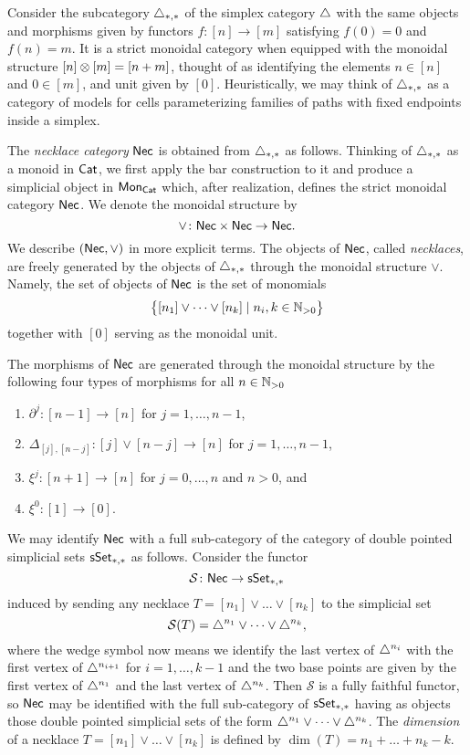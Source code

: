 Consider the subcategory $\triangle_{*,*}$ of the simplex category $\triangle$ with the same objects and morphisms given by functors $f \colon [n] \to [m]$ satisfying $f(0) = 0$ and $f(n) = m$.
It is a strict monoidal category when equipped with the monoidal structure $[n] \otimes [m] = [n+m]$, thought of as identifying the elements $n \in [n]$ and $0 \in [m]$, and unit given by $[0]$.
Heuristically, we may think of $\triangle_{*,*}$ as a category of models for cells parameterizing families of paths with fixed endpoints inside a simplex.


The \textit{necklace category} $\mathsf{Nec}$ is obtained from $\triangle_{*,*}$ as follows.
Thinking of $\triangle_{*,*}$ as a monoid in $\mathsf{Cat}$, we first apply the bar construction to it and produce a simplicial object in $\mathsf{Mon}_{\mathsf{Cat}}$ which, after realization, defines the strict monoidal category $\mathsf{Nec}$.
We denote the monoidal structure by
\[
\vee \colon \mathsf{Nec} \times \mathsf{Nec} \to \mathsf{Nec}.
\]
We describe $(\mathsf{Nec}, \vee)$ in more explicit terms.
The objects of $\mathsf{Nec}$, called \textit{necklaces}, are freely generated by the objects of $\triangle_{*,*}$ through the monoidal structure $\vee$.
Namely, the set of objects of $\mathsf{Nec}$ is the set of monomials
\[
\big\{ [n_1] \vee \dots \vee[n_k] \mid n_i, k \in \mathbb{N}_{>0} \big\}
\]
together with $[0]$ serving as the monoidal unit.

The morphisms of $\mathsf{Nec}$ are generated through the monoidal structure by the following four types of morphisms for all $n \in\mathbb{N}_{>0}$
\begin{enumerate}
	\item $\partial^j \colon [n-1] \to [n]$ for $j = 1, \dots, n-1$,
	\item $\Delta_{[j], [n-j]} \colon [j] \vee [n-j] \to [n]$ for $j = 1, \dots, n-1$,
	\item $\xi^j \colon [n+1] \to [n]$ for $j = 0, \dots, n$ and $n>0$, and
	\item $\xi^0 \colon [1] \to [0]$.
\end{enumerate}
We may identify $\mathsf{Nec}$ with a full sub-category of the category of double pointed simplicial sets $\mathsf{sSet}_{*,*}$ as follows.
Consider the functor
\[
\mathcal{S} \colon \mathsf{Nec} \to \mathsf{sSet}_{*,*}
\]
induced by sending any necklace $T = [n_1] \vee \dots \vee[n_k]$ to the simplicial set
\[
\mathcal{S}(T) = \triangle^{n_1} \vee \dots \vee \triangle^{n_k},
\]
where the wedge symbol now means we identify the last vertex of $\triangle^{n_i}$ with the first vertex of $\triangle^{n_{i+1}}$ for $i = 1, \dots, k-1$ and the two base points are given by the first vertex of $\triangle^{n_1}$ and the last vertex of $\triangle^{n_k}$.
Then $\mathcal{S}$ is a fully faithful functor, so $\mathsf{Nec}$ may be identified with the full sub-category of $\mathsf{sSet}_{*,*}$ having as objects those double pointed simplicial sets of the form $\triangle^{n_1} \vee \dots \vee \triangle^{n_k}$.
The \textit{dimension} of a necklace $T = [n_1] \vee\dots\vee [n_k]$ is defined by $\dim(T) = n_1 + \dots + n_k-k$.

